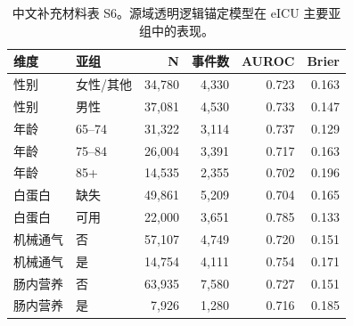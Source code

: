 \documentclass[11pt]{ctexart}
\begin{document}
\begin{table}[htbp]
\centering
\caption{中文补充材料表 S5。GERI-NutriRisk-ICU 源域迁移中的营养构念敏感性分析。粗体表示模型行中的最优值；Brier 和 ECE 越低越好。}
\label{tab:sens_s5}
\noindent{}
\end{table}

\begin{table}[htbp]
\centering
\caption{中文补充材料表 S6。源域透明逻辑锚定模型在 eICU 主要亚组中的表现。}
\label{tab:subgroup_s6}
\small
\begin{tabular}{llrrrr}
\toprule
维度 & 亚组 & N & 事件数 & AUROC & Brier\\
\midrule
性别 & 女性/其他 & 34,780 & 4,330 & 0.723 & 0.163\\
性别 & 男性 & 37,081 & 4,530 & 0.733 & 0.147\\
年龄 & 65--74 & 31,322 & 3,114 & 0.737 & 0.129\\
年龄 & 75--84 & 26,004 & 3,391 & 0.717 & 0.163\\
年龄 & 85+ & 14,535 & 2,355 & 0.702 & 0.196\\
白蛋白 & 缺失 & 49,861 & 5,209 & 0.704 & 0.165\\
白蛋白 & 可用 & 22,000 & 3,651 & 0.785 & 0.133\\
机械通气 & 否 & 57,107 & 4,749 & 0.720 & 0.151\\
机械通气 & 是 & 14,754 & 4,111 & 0.754 & 0.171\\
肠内营养 & 否 & 63,935 & 7,580 & 0.727 & 0.151\\
肠内营养 & 是 & 7,926 & 1,280 & 0.716 & 0.185\\
\bottomrule
\end{tabular}
\end{table}
\end{document}
